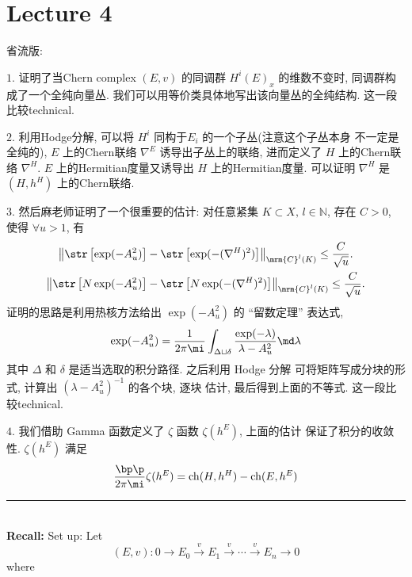 \section{Lecture 4}
\label{sec:lecture-4}
\setcounter{equation}{0}

省流版: 

$1.$ 证明了当Chern complex $(E,v)$ 的同调群 $H^i(E)_x$ 的维数不变时,
同调群构成了一个全纯向量丛. 我们可以用等价类具体地写出该向量丛的全纯结构. 
这一段比较technical.

$2.$ 利用Hodge分解, 可以将 $H^i$ 同构于$E_i$ 的一个子丛(注意这个子丛本身
不一定是全纯的), $E$ 上的Chern联络 $\nabla^E$ 诱导出子丛上的联络, 进而定义了 $H$ 
上的Chern联络 $\nabla^H$. $E$ 上的Hermitian度量又诱导出 $H$ 上的Hermitian度量. 
可以证明 $\nabla^H$ 是 $(H,h^H)$ 上的Chern联络.

$3.$ 然后麻老师证明了一个很重要的估计: 对任意紧集 $K\subset X,\,l\in\mathbb{N}$, 
存在 $C>0$, 使得 $\forall u>1$, 有 
\begin{gather*}
    \left\|\str\left[\exp(-A_u^2)\right]
    -\str\left[\exp(-(\nabla^H)^2)\right]\right\|_{\mrm{C}^l(K)}
    \leq \frac{C}{\sqrt{u}}. \\    
    \left\|\str\left[N\exp(-A_u^2)\right]
    -\str\left[N\exp(-(\nabla^H)^2)\right]\right\|_{\mrm{C}^l(K)}
    \leq \frac{C}{\sqrt{u}}.
\end{gather*}
证明的思路是利用热核方法给出 $\exp(-A_u^2)$ 的 “留数定理” 表达式, 
\begin{equation*}
    \exp(-A_u^2)
    =\frac{1}{2\pi\mi}\int_{\Delta\sqcup\delta}
    \frac{\exp(-\lambda)}{\lambda-A_u^2}\md\lambda 
\end{equation*}
其中 $\Delta$ 和 $\delta$ 是适当选取的积分路径. 之后利用 Hodge 分解
可将矩阵写成分块的形式, 计算出 $(\lambda-A_u^2)^{-1}$ 的各个块, 逐块
估计, 最后得到上面的不等式. 这一段比较technical.

$4.$ 我们借助 Gamma 函数定义了 $\zeta$ 函数 $\zeta(h^E)$, 上面的估计
保证了积分的收敛性. $\zeta(h^E)$ 满足
\begin{equation*}
    \frac{\bp\p}{2\pi\mi}\zeta(h^E) = {\rm ch}(H,h^H)-{\rm ch}(E,h^E)
\end{equation*}

\hrule ~\\

\textbf{Recall:} Set up: 
Let
\begin{equation*}
    (E,v):0\to E_0\xrightarrow{v}E_1\xrightarrow{v}
    \cdots\xrightarrow{v}E_n\to0
\end{equation*}
where 

